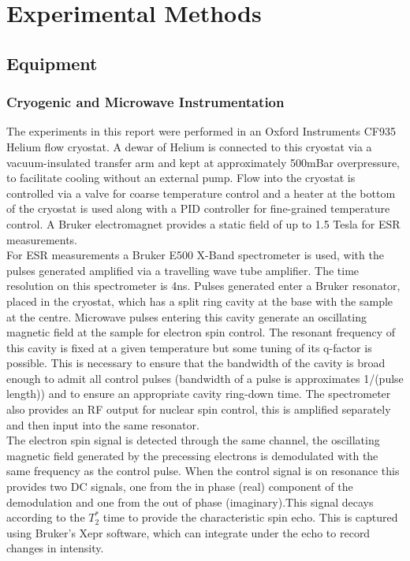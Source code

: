\chapter{Experimental Methods}


\section{Equipment}
\subsection{Cryogenic and Microwave Instrumentation}

The experiments in this report were performed in an Oxford Instruments CF935 Helium flow cryostat.
A dewar of Helium is connected to this cryostat via a vacuum-insulated transfer arm and kept at approximately 500mBar overpressure, to facilitate cooling without an external pump.
Flow into the cryostat is controlled via a valve for coarse temperature control and a heater at the bottom of the cryostat is used along with a PID controller for fine-grained temperature control.
A Bruker electromagnet provides a static field of up to 1.5 Tesla for ESR measurements.
\\
For ESR measurements a Bruker E500 X-Band spectrometer is used, with the pulses generated amplified via a travelling wave tube amplifier.
The time resolution on this spectrometer is 4ns.
Pulses generated enter a Bruker resonator, placed in the cryostat, which has a split ring cavity at the base with the sample at the centre.
Microwave pulses entering this cavity generate an oscillating magnetic field at the sample for electron spin control. 
The resonant frequency of this cavity is fixed at a given temperature but some tuning of its q-factor is possible.
This is necessary to ensure that the bandwidth of the cavity is broad enough to admit all control pulses (bandwidth of a pulse is approximates 1/(pulse length)) and to ensure an appropriate cavity ring-down time.
The spectrometer also provides an RF output for nuclear spin control, this is amplified separately and then input into the same resonator.
\\
The electron spin signal is detected through the same channel, the oscillating magnetic field generated by the precessing electrons is demodulated with the same frequency as the control pulse.
When the control signal is on resonance this provides two DC signals, one from the in phase (real) component of the demodulation and one from the out of phase (imaginary).This signal decays according to the $T_2^*$ time to provide the characteristic spin echo.
This is captured using Bruker's Xepr software, which can integrate under the echo to record changes in intensity.

